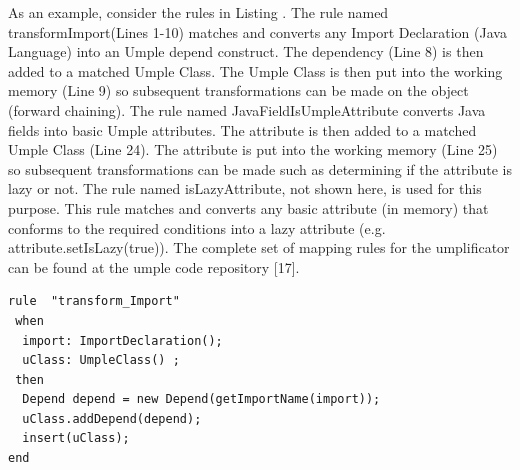 As an example, consider the rules in Listing . The rule named transformImport(Lines 1-10) matches and converts any Import Declaration (Java Language) into an Umple depend construct. The dependency (Line 8) is then added to a matched Umple Class. The Umple Class is then put into the working memory (Line 9) so subsequent transformations can be made on the object (forward chaining). The rule named JavaFieldIsUmpleAttribute converts Java fields into basic Umple attributes. The attribute is then added to a matched Umple Class (Line 24). The attribute is put into the working memory (Line 25) so subsequent transformations can be made such as determining if the attribute is lazy or not. The rule named isLazyAttribute, not shown here, is used for this purpose. This rule matches and converts any basic attribute (in memory) that conforms to the required conditions into a lazy attribute (e.g. attribute.setIsLazy(true)). The complete set of mapping rules for the umplificator can be found at the umple code repository [17].

\begin{lstlisting}[language={drools},label={lst:rule_import}, caption=Initial Refactoring Mapping Rules]
 rule  "transform_Import"
 when
  import: ImportDeclaration();
  uClass: UmpleClass() ;
 then
  Depend depend = new Depend(getImportName(import));
  uClass.addDepend(depend);
  insert(uClass);
end
\end{lstlisting}




